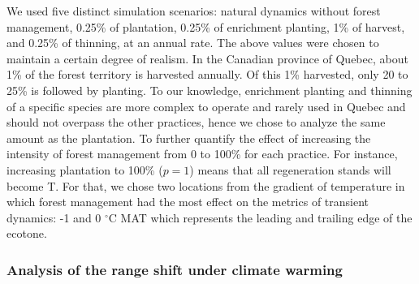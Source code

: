 \documentclass[12pt]{article}
\begin{document}
We used five distinct simulation scenarios: natural dynamics without
forest management, 0.25\% of plantation, 0.25\% of enrichment planting,
1\% of harvest, and 0.25\% of thinning, at an annual rate. The above
values were chosen to maintain a certain degree of realism. In the
Canadian province of Quebec, about 1\% of the forest territory is
harvested annually. Of this 1\% harvested, only 20 to 25\% is followed
by planting. To our knowledge, enrichment planting and thinning of a
specific species are more complex to operate and rarely used in Quebec
and should not overpass the other practices, hence we chose to analyze
the same amount as the plantation. To further quantify the effect of
increasing the intensity of forest management from 0 to 100\% for each
practice. For instance, increasing plantation to 100\% (\(p = 1\)) means
that all regeneration stands will become T. For that, we chose two
locations from the gradient of temperature in which forest management
had the most effect on the metrics of transient dynamics: -1 and 0
\(^{\circ}\)C MAT which represents the leading and trailing edge of the
ecotone.

\hypertarget{analysis-of-the-range-shift-under-climate-warming}{%
\subsubsection{Analysis of the range shift under climate
warming}\label{analysis-of-the-range-shift-under-climate-warming}}
\end{document}
